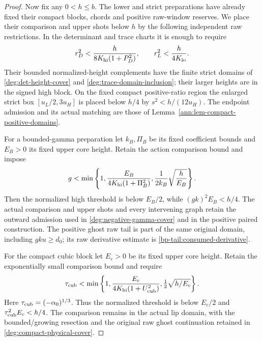 \begin{proof}
Now fix any \(0<h\le b\). The lower and strict preparations have
already fixed their compact blocks, chords and positive raw-window
reserves. We place their comparison and upper shots below \(h\)
by the following independent raw restrictions. In the determinant and
trace charts it is enough to require
\begin{equation}\label{eq:regional-det-trace-cap-bounds}
r_D^2<\frac{h}{8K_{\rm hi}(1+P_D^2)},\qquad
r_L^2<\frac{h}{4K_{\rm lo}}.
\end{equation}
Their bounded normalized-height complements have the finite strict
domains of \eqref{deg:det-height-cover} and
\eqref{deg:trace-domain-inclusion}; their larger heights are in the
signed high block. On the fixed compact positive-ratio region the
enlarged strict box \([u_L/2,3u_H]\) is placed below \(h/4\) by
\(s^2<h/(12u_H)\). The endpoint admission and its actual matching
are those of Lemma~\ref{ann:lem-compact-positive-domains}.

For a bounded-gamma preparation let \(k_B,\Pi_B\) be its fixed
coefficient bounds and \(E_B>0\) its fixed upper core height. Retain
the action comparison bound and impose
\begin{equation}\label{eq:regional-gamma-cap-bounds}
g<\min\left\{1,\frac{E_B}{4K_{\rm hi}(1+\Pi_B^2)},
                       \frac1{2k_B}\sqrt{\frac h{E_B}}\right\}.
\end{equation}
Then the normalized high threshold is below \(E_B/2\), while
\((gk)^2E_B<h/4\). The actual comparison and upper shots and every
intervening graph retain the outward admission used in
\eqref{deg:negative-gamma-cover} and in the positive paired
construction. The positive ghost raw tail is part of the same original
domain, including \(gku\ge d_0\); its raw derivative estimate is
\eqref{bp-tail:consumed-derivative}.

For the compact cubic block let \(E_c>0\) be its fixed upper core
height. Retain the exponentially small comparison bound and require
\begin{equation}\label{eq:regional-cubic-cap-bounds}
\tau_{\rm cub}<\min\left\{1,
 \frac{E_c}{4K_{\rm hi}(1+U_{\rm cub}^2)},
 \tfrac12\sqrt{h/E_c}\right\}.
\end{equation}
Here \(\tau_{\rm cub}=(-\alpha_0)^{1/3}\). Thus the normalized
threshold is below \(E_c/2\) and
\(\tau_{\rm cub}^2E_c<h/4\). The comparison remains in the actual
lip domain, with the bounded/growing resection and the original raw
ghost continuation retained in \eqref{deg:compact-physical-cover}.


\end{proof}
